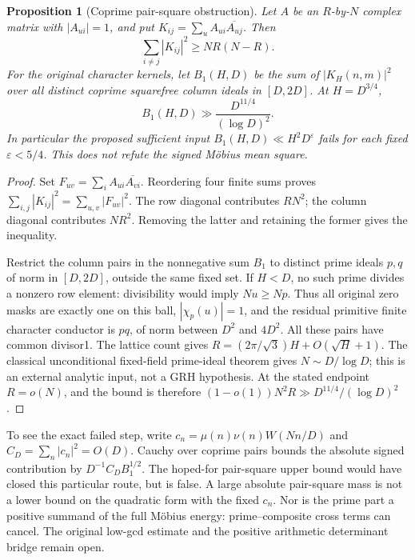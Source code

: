 \documentclass[11pt]{article}
\newtheorem{proposition}[theorem]{Proposition}
\theoremstyle{definition}\newtheorem{definition}[theorem]{Definition}
\theoremstyle{remark}\newtheorem{remark}[theorem]{Remark}
\begin{document}
\begin{proposition}[Coprime pair-square obstruction]\label{prop:pair-barrier}
Let $A$ be an $R$-by-$N$ complex matrix with $|A_{ui}|=1$, and put
$K_{ij}=\sum_u A_{ui}\overline{A_{uj}}$. Then
\[
 \sum_{i\ne j}|K_{ij}|^2\ge NR(N-R).
\]
For the original character kernels, let $B_1(H,D)$ be the sum of
$|K_H(n,m)|^2$ over all distinct coprime squarefree column ideals in
$[D,2D]$. At $H=D^{3/4}$,
\[
 B_1(H,D)\gg \frac{D^{11/4}}{(\log D)^2}.
\]
In particular the proposed sufficient input
$B_1(H,D)\ll H^2D^\varepsilon$ fails for each fixed $\varepsilon<5/4$.
This does not refute the signed M\"obius mean square.
\end{proposition}
\begin{proof}
Set $F_{uv}=\sum_i A_{ui}\overline{A_{vi}}$. Reordering four finite sums
proves $\sum_{i,j}|K_{ij}|^2=\sum_{u,v}|F_{uv}|^2$.
The row diagonal contributes $RN^2$; the column diagonal contributes
$NR^2$. Removing the latter and retaining the former gives the inequality.

Restrict the column pairs in the nonnegative sum $B_1$ to distinct prime
ideals $p,q$ of norm in $[D,2D]$, outside the same fixed set. If $H<D$,
no such prime divides a nonzero row element: divisibility would imply
$Nu\ge Np$. Thus all original zero masks are exactly one on this ball,
$|\chi_p(u)|=1$, and the residual primitive finite character conductor is
$pq$, of norm between $D^2$ and $4D^2$. All these pairs have common divisor1.
The lattice count gives $R=(2\pi/\sqrt3)H+O(\sqrt H+1)$.
The classical unconditional fixed-field prime-ideal theorem gives
$N\sim D/\log D$; this is an external analytic input, not a GRH hypothesis.
At the stated endpoint $R=o(N)$, and the bound is therefore
$(1-o(1))N^2R\gg D^{11/4}/(\log D)^2$.
\end{proof}

To see the exact failed step, write $c_n=\mu(n)\nu(n)W(Nn/D)$ and
$C_D=\sum_n|c_n|^2=O(D)$. Cauchy over coprime pairs bounds the absolute
signed contribution by $D^{-1}C_DB_1^{1/2}$. The hoped-for pair-square
upper bound would have closed this particular route, but is false.
A large absolute pair-square mass is not a lower bound on the quadratic
form with the fixed $c_n$. Nor is the prime part a positive summand of the
full M\"obius energy: prime--composite cross terms can cancel. The original
low-gcd estimate and the positive arithmetic determinant bridge remain open.
\end{document}
